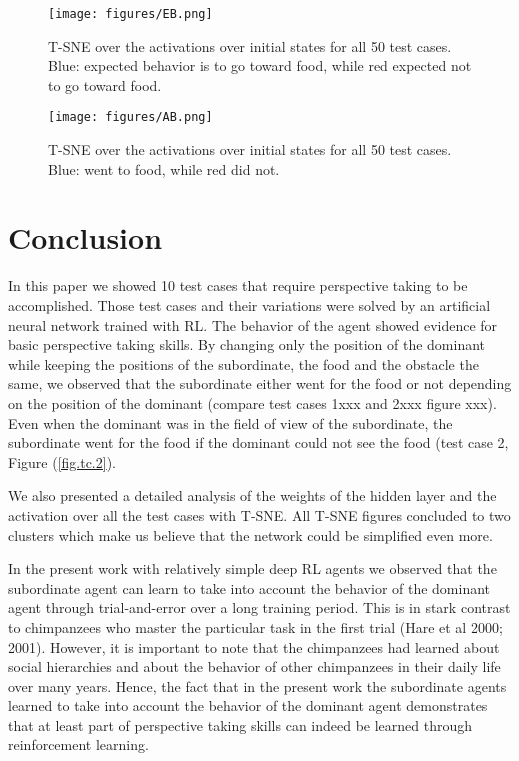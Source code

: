 \documentclass{article}
\begin{document}
\begin{figure}[H]
\texttt{[image: figures/EB.png]}
\caption{T-SNE over the activations over initial states for all 50 test cases. Blue: expected behavior is to go toward food, while red expected not to go toward food.}
\label{fig.expected.behavior}
\end{figure}
\begin{figure}[H]
\texttt{[image: figures/AB.png]}
\caption{T-SNE over the activations over initial states for all 50 test cases. Blue: went  to food, while red did not.}
\label{fig.actual.behavior}
\end{figure}

\section{Conclusion}
In this paper we showed 10 test cases that require perspective taking to be accomplished. Those test cases and their variations were solved by an artificial neural network trained with RL. The behavior of the agent showed evidence for basic perspective taking skills. By changing only the position of the dominant while keeping the positions of the subordinate, the food and the obstacle the same, we observed that the subordinate either went for the food or not depending on the position of the dominant (compare test cases 1xxx and 2xxx figure xxx). Even when the dominant was in the field of view of the subordinate, the subordinate went for the food if the dominant could not see the food (test case 2, Figure (\ref{fig.tc.2}).  

We also presented a detailed analysis of the weights of the hidden layer and the activation over all the test cases with T-SNE. All T-SNE figures concluded to two clusters which make us believe that the network could be simplified even more. 

In the present work with relatively simple deep RL agents we observed that the subordinate agent can learn to take into account the behavior of the dominant agent through trial-and-error over a long training period. This is in stark contrast to chimpanzees who master the particular task in the first trial  (Hare et al 2000; 2001). However, it is important to note that the chimpanzees had learned about social hierarchies and about the behavior of other chimpanzees in their daily life over many years. Hence, the fact that in the present work the subordinate agents learned to take into account the behavior of the dominant agent demonstrates that at least part of perspective taking skills can indeed be learned through reinforcement learning. 
\end{document}
